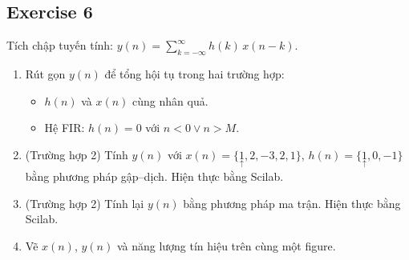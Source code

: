 \subsection{Exercise 6}
Tích chập tuyến tính: $y(n) = \sum_{k=-\infty}^{\infty} h(k)\,x(n-k)$.
\begin{enumerate}
    \item Rút gọn $y(n)$ để tổng hội tụ trong hai trường hợp:
    \begin{itemize}
        \item $h(n)$ và $x(n)$ cùng nhân quả.
        \item Hệ FIR: $h(n) = 0$ với $n < 0 \lor n > M$.
    \end{itemize}
    \item (Trường hợp 2) Tính $y(n)$ với $x(n) = \{\underset{\uparrow}{1}, 2, -3, 2, 1\}$, $h(n) = \{\underset{\uparrow}{1}, 0, -1\}$ bằng phương pháp gập--dịch. Hiện thực bằng Scilab.
    \item (Trường hợp 2) Tính lại $y(n)$ bằng phương pháp ma trận. Hiện thực bằng Scilab.
    \item Vẽ $x(n)$, $y(n)$ và năng lượng tín hiệu trên cùng một figure.
\end{enumerate}



